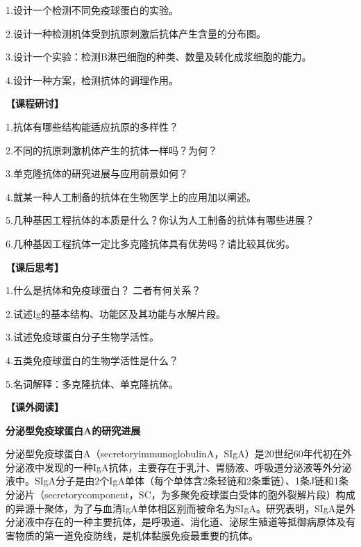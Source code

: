 1.设计一个检测不同免疫球蛋白的实验。

2.设计一种检测机体受到抗原刺激后抗体产生含量的分布图。

3.设计一个实验：检测B淋巴细胞的种类、数量及转化成浆细胞的能力。

4.设计一种方案，检测抗体的调理作用。

\noindent\textbf{【课程研讨】}

1.抗体有哪些结构能适应抗原的多样性？

2.不同的抗原刺激机体产生的抗体一样吗？为何？

3.单克隆抗体的研究进展与应用前景如何？

4.就某一种人工制备的抗体在生物医学上的应用加以阐述。

5.几种基因工程抗体的本质是什么？你认为人工制备的抗体有哪些进展？

6.几种基因工程抗体一定比多克隆抗体具有优势吗？请比较其优劣。

\noindent\textbf{【课后思考】}

1.什么是抗体和免疫球蛋白？ 二者有何关系？

2.试述Ig的基本结构、功能区及其功能与水解片段。

3.试述免疫球蛋白分子生物学活性。

4.五类免疫球蛋白的生物学活性是什么？

5.名词解释：多克隆抗体、单克隆抗体。

\noindent\textbf{【课外阅读】}

\begin{center}
\textbf{\Large 分泌型免疫球蛋白A的研究进展}
\end{center}
分泌型免疫球蛋白A（secretoryimmunoglobulinA，SIgA）是20世纪60年代初在外分泌液中发现的一种IgA抗体，主要存在于乳汁、胃肠液、呼吸道分泌液等外分泌液中。SIgA分子是由2个IgA单体（每个单体含2条轻链和2条重链）、1条J链和1条分泌片（secretorycomponent，SC，为多聚免疫球蛋白受体的胞外裂解片段）构成的异源十聚体，为了与血清IgA单体相区别而被命名为SIgA。研究表明，SIgA是外分泌液中存在的一种主要抗体，是呼吸道、消化道、泌尿生殖道等抵御病原体及有害物质的第一道免疫防线，是机体黏膜免疫最重要的抗体。


